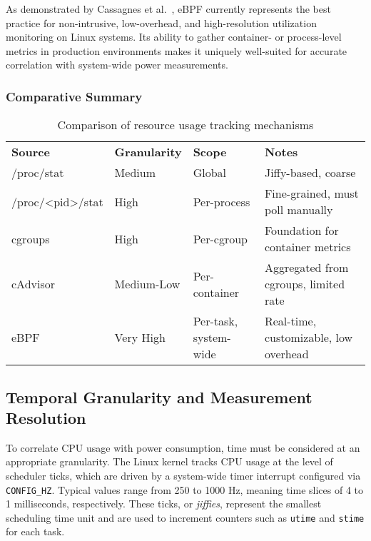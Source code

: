 As demonstrated by Cassagnes et al.~\parencite{cassagnesRiseEBPFNonintrusive2020}, eBPF currently represents the best practice for non-intrusive, low-overhead, and high-resolution utilization monitoring on Linux systems. Its ability to gather container- or process-level metrics in production environments makes it uniquely well-suited for accurate correlation with system-wide power measurements.

\subsubsection*{Comparative Summary}

\begin{table}[H]
\centering
\begin{tabular}{| m{3.2cm} | m{2cm}| m{3.6cm} | m{4cm} |}
\hline
\textbf{Source} & \textbf{Granularity} & \textbf{Scope} & \textbf{Notes} \\
\Xhline{1.5pt}
/proc/stat & Medium & Global & Jiffy-based, coarse \\
\hline
/proc/\textless pid\textgreater/stat & High & Per-process & Fine-grained, must poll manually \\
\hline
cgroups & High & Per-cgroup & Foundation for container metrics \\
\hline
cAdvisor & Medium-Low & Per-container & Aggregated from cgroups, limited rate \\
\hline
eBPF & Very High & Per-task, system-wide & Real-time, customizable, low overhead \\
\hline
\end{tabular}
\caption{Comparison of resource usage tracking mechanisms}
\end{table}

\subsection{Temporal Granularity and Measurement Resolution}
\label{sec:granularity}
To correlate CPU usage with power consumption, time must be considered at an appropriate granularity. The Linux kernel tracks CPU usage at the level of scheduler ticks, which are driven by a system-wide timer interrupt configured via \texttt{CONFIG\_HZ}. Typical values range from 250 to 1000 Hz, meaning time slices of 4 to 1 milliseconds, respectively. These ticks, or \emph{jiffies}, represent the smallest scheduling time unit and are used to increment counters such as \texttt{utime} and \texttt{stime} for each task.

